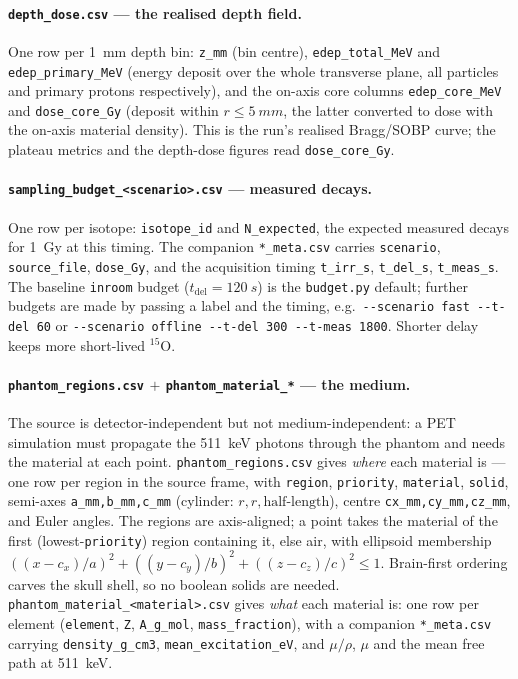 \documentclass[11pt]{article}
\newcommand{\Ox}[1]{{}^{#1}\mathrm{O}}
\newcommand{\tdel}{t_{\mathrm{del}}}
\newcommand{\file}[1]{\texttt{#1}}
\begin{document}
\paragraph{\file{depth\_dose.csv} --- the realised depth field.} One row per
\SI{1}{mm} depth bin: \file{z\_mm} (bin centre), \file{edep\_total\_MeV} and
\file{edep\_primary\_MeV} (energy deposit over the whole transverse plane, all
particles and primary protons respectively), and the on-axis core columns
\file{edep\_core\_MeV} and \file{dose\_core\_Gy} (deposit within
$r\le\SI{5}{mm}$, the latter converted to dose with the on-axis material
density). This is the run's realised Bragg/SOBP curve; the plateau metrics and
the depth-dose figures read \file{dose\_core\_Gy}.

\paragraph{\file{sampling\_budget\_<scenario>.csv} --- measured decays.} One row
per isotope: \file{isotope\_id} and \file{N\_expected}, the expected measured
decays for \SI{1}{Gy} at this timing. The companion \file{*\_meta.csv} carries
\file{scenario}, \file{source\_file}, \file{dose\_Gy}, and the acquisition timing
\file{t\_irr\_s}, \file{t\_del\_s}, \file{t\_meas\_s}. The baseline
\file{inroom} budget ($\tdel=\SI{120}{s}$) is the \file{budget.py} default;
further budgets are made by passing a label and the timing, e.g.\
\file{-{}-scenario fast -{}-t-del 60} or \file{-{}-scenario offline -{}-t-del
300 -{}-t-meas 1800}. Shorter delay keeps more short-lived $\Ox{15}$.

\paragraph{\file{phantom\_regions.csv} $+$ \file{phantom\_material\_*} --- the
medium.} The source is detector-independent but not medium-independent: a PET
simulation must propagate the \SI{511}{keV} photons through the phantom and needs
the material at each point. \file{phantom\_regions.csv} gives \emph{where} each
material is --- one row per region in the source frame, with \file{region},
\file{priority}, \file{material}, \file{solid}, semi-axes \file{a\_mm,b\_mm,c\_mm}
(cylinder: $r,r,\text{half-length}$), centre \file{cx\_mm,cy\_mm,cz\_mm}, and Euler
angles. The regions are axis-aligned; a point takes the material of the first
(lowest-\file{priority}) region containing it, else air, with ellipsoid membership
$((x-c_x)/a)^2+((y-c_y)/b)^2+((z-c_z)/c)^2\le 1$. Brain-first ordering carves the
skull shell, so no boolean solids are needed.
\file{phantom\_material\_<material>.csv} gives \emph{what} each material is: one row
per element (\file{element}, \file{Z}, \file{A\_g\_mol}, \file{mass\_fraction}),
with a companion \file{*\_meta.csv} carrying \file{density\_g\_cm3},
\file{mean\_excitation\_eV}, and $\mu/\rho$, $\mu$ and the mean free path at
\SI{511}{keV}.
\end{document}
